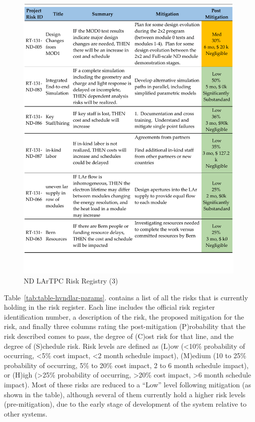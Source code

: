 \begin{figure}
\centering 
\includegraphics[width=1\linewidth]{graphics/lartpc/lartpcrisk3.pdf}
\caption{\label{fig:lartpcrisk3} ND LArTPC Risk Registry (3)}
\end{figure}

Table~\ref{tab:table-hvndlar-params}.
contains a list of all the
risks that  is currently holding in the  risk register.  Each line includes the official  risk register identification number, a description of the risk, the proposed mitigation for the risk, and finally three columns rating the post-mitigation (P)robability that the risk described comes to pass, the degree of (C)ost risk for that line, and the degree of (S)chedule risk.  Risk levels are defined as (L)ow (<10\% probability of occurring, <5\% cost impact, <2 month schedule impact), (M)edium (10 to 25\% probability of occurring, 5\% to 20\% cost impact, 2 to 6 month schedule impact), or (H)igh (>25\% probability of occurring, >20\% cost impact, >6 month schedule impact).  Most of these risks are reduced to a ``Low'' level following mitigation (as shown in the table), although several of them currently hold a higher risk levels (pre-mitigation), due to the early stage of development of the  system relative to other systems.  

